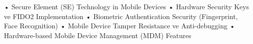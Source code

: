 • Secure Element (SE) Technology in Mobile Devices
• Hardware Security Keys ve FIDO2 Implementation
• Biometric Authentication Security (Fingerprint, Face Recognition)
• Mobile Device Tamper Resistance ve Anti-debugging
• Hardware-based Mobile Device Management (MDM) Features